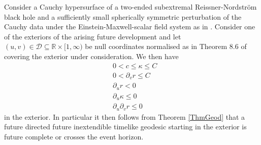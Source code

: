 \documentclass[reqno]{article}
\newcommand{\R}{\mathbb{R}}
\newcommand{\rd}{\partial}
\begin{document}
\begin{proposition} \label{PropLukOhComplete}
Consider a Cauchy hypersurface of a two-ended subextremal Reissner-Nordstr\"om black hole and a sufficiently small spherically symmetric perturbation of the Cauchy data under the Einstein-Maxwell-scalar field system as in \cite{LukOh19II}. Consider one of the exteriors of the arising future development and let $(u,v) \in \mathcal{D} \subseteq \R \times [1,\infty)$ be null coordinates normalised as in Theorem 8.6 of \cite{LukOh19II} covering the exterior under consideration.  We then have
\begin{align}
&0 < c \leq \kappa \leq C  \label{EqAlign1}\\ 
&0< \rd_v r \leq C \label{EqAlign2}\\
&\rd_u r < 0 \label{EqAlign3}\\
&\rd_u \kappa \leq 0 \label{EqAlign4}\\
&\rd_u \rd_v r \leq 0 \label{EqAlign5}
\end{align}
in the exterior.
In particular it then follows from Theorem \ref{ThmGeod} that a future directed future inextendible timelike geodesic starting in the exterior is future complete or crosses the event horizon.
\end{proposition}
\end{document}
